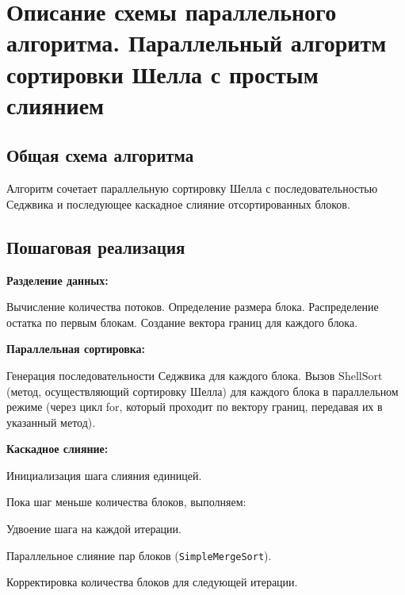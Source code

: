 \documentclass[a4paper,14pt]{extarticle}
\begin{document}
\newpage

\section*{Описание схемы параллельного алгоритма. Параллельный алгоритм сортировки Шелла с простым слиянием}

\subsection*{Общая схема алгоритма}
Алгоритм сочетает параллельную сортировку Шелла с последовательностью Седжвика и последующее каскадное слияние отсортированных блоков.

\subsection*{Пошаговая реализация}

\begin{enumerate}[leftmargin=*]
    \item \textbf{Разделение данных:}
    \begin{algorithmic}[1]
        \State Вычисление количества потоков.
        \State Определение размера блока.
        \State Распределение остатка по первым блокам.
        \State Создание вектора границ для каждого блока.
    \end{algorithmic}

    \item \textbf{Параллельная сортировка:}
    \begin{algorithmic}[1]
        \State Генерация последовательности Седжвика для каждого блока.
        \State Вызов $\text{ShellSort}$ (метод, осуществляющий сортировку Шелла) для каждого блока в параллельном режиме (через цикл for, который проходит по вектору границ, передавая их в указанный метод).
    \end{algorithmic}

    \item \textbf{Каскадное слияние:}
    \begin{algorithmic}[1]
        \item Инициализация шага слияния единицей.
        \item Пока шаг меньше количества блоков, выполняем:
        \begin{algorithmic}[1]
            \item Удвоение шага на каждой итерации.
            \item Параллельное слияние пар блоков (\texttt{SimpleMergeSort}).
            \item Корректировка количества блоков для следующей итерации.
        \end{algorithmic}
    \end{algorithmic}
\end{enumerate}
\end{document}
